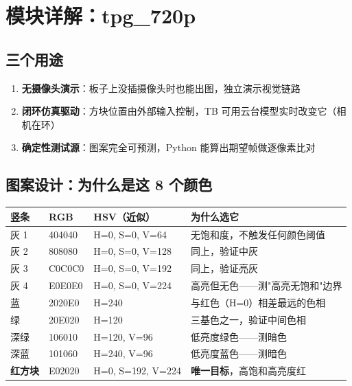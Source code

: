 \section{模块详解：tpg\_720p}

\subsection{三个用途}

\begin{enumerate}
  \item \textbf{无摄像头演示}：板子上没插摄像头时也能出图，独立演示视觉链路
  \item \textbf{闭环仿真驱动}：方块位置由外部输入控制，TB 可用云台模型实时改变它（相机在环）
  \item \textbf{确定性测试源}：图案完全可预测，Python 能算出期望帧做逐像素比对
\end{enumerate}

\subsection{图案设计：为什么是这 8 个颜色}

\begin{center}
\renewcommand{\arraystretch}{1.2}
\begin{tabular}{llll}
\toprule
\textbf{竖条} & \textbf{RGB} & \textbf{HSV（近似）} & \textbf{为什么选它} \\
\midrule
灰 1 & 404040 & H=0, S=0, V=64 & 无饱和度，不触发任何颜色阈值 \\
灰 2 & 808080 & H=0, S=0, V=128 & 同上，验证中灰 \\
灰 3 & C0C0C0 & H=0, S=0, V=192 & 同上，验证亮灰 \\
灰 4 & E0E0E0 & H=0, S=0, V=224 & 高亮但无色——测"高亮无饱和"边界 \\
蓝   & 2020E0 & H=240 & 与红色（H=0）相差最远的色相 \\
绿   & 20E020 & H=120 & 三基色之一，验证中间色相 \\
深绿 & 106010 & H=120, V=96 & 低亮度绿色——测暗色 \\
深蓝 & 101060 & H=240, V=96 & 低亮度蓝色——测暗色 \\
\midrule
\textbf{红方块} & E02020 & H=0, S=192, V=224 & \textbf{唯一目标}，高饱和高亮度红 \\
\bottomrule
\end{tabular}
\end{center}

